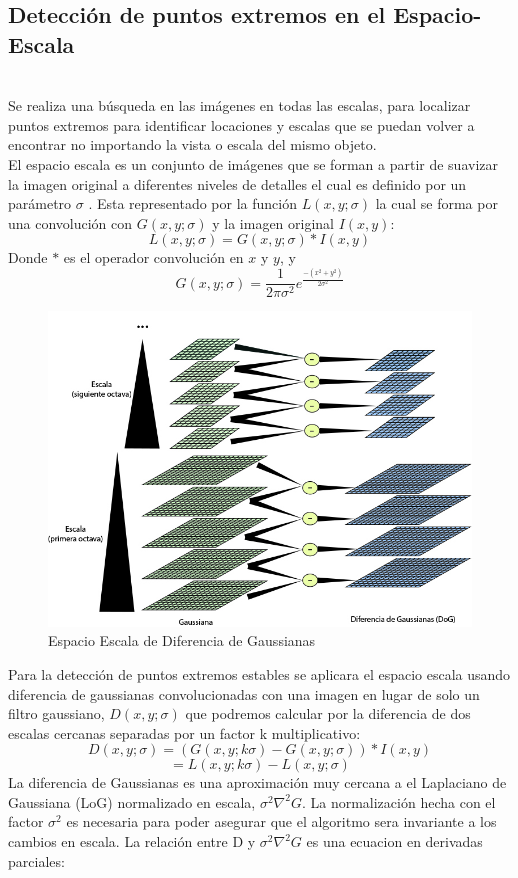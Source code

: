 	\subsection{Detección de puntos extremos en el Espacio-Escala} \hfill \\
		Se realiza una búsqueda en las imágenes en todas las escalas, para localizar puntos extremos para identificar locaciones y escalas que se puedan volver a encontrar no importando la vista o escala del mismo objeto.\\
		El espacio escala es un conjunto de imágenes que se forman a partir de suavizar la imagen original a diferentes niveles de detalles el cual es definido por un parámetro $\sigma$ . Esta representado por la función $L(x,y;\sigma)$ la cual se forma por una convolución con $G(x,y;\sigma)$ y la imagen original $I(x,y)$:
		$$L(x,y;\sigma) = G(x,y;\sigma) * I(x,y)$$
		Donde $*$ es el operador convolución en $x$ y $y$, y
		$$ G(x,y;\sigma) = \frac{1}{2\pi\sigma^2}e^{\frac{-(x^2+y^2)}{2\sigma^2}}$$
		\begin{figure}[h]
			\centering
				\includegraphics[scale=0.5]{img/spaceScale.jpg}
			\caption{Espacio Escala de Diferencia de Gaussianas}
		\end{figure}		
		Para la detección de puntos extremos estables se aplicara el espacio escala usando diferencia de gaussianas convolucionadas con una imagen en lugar de solo un filtro gaussiano, $D(x,y;\sigma)$  que podremos calcular por la diferencia de dos escalas cercanas separadas por un factor k multiplicativo:
		$$D(x,y;\sigma) = (G(x,y;k\sigma) - G(x,y;\sigma)) * I(x,y)$$ $$= L(x,y;k\sigma) - L(x,y;\sigma)$$
		La diferencia de Gaussianas es una aproximación muy cercana a el Laplaciano de Gaussiana (LoG) normalizado en escala, $\sigma^2 \nabla^2 G$. La normalización hecha con el factor $\sigma^2$ es necesaria para poder asegurar que el algoritmo sera invariante a los cambios en escala. La relación entre D y $\sigma^2 \nabla^2 G$ es una ecuacion en derivadas parciales:

